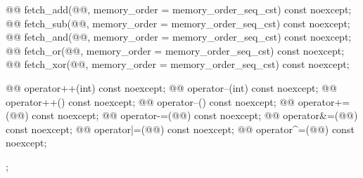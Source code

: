 \begin{codeblock}
{{    @@ fetch_add(@@,
                       memory_order = memory_order_seq_cst) const noexcept;
    @@ fetch_sub(@@,
                       memory_order = memory_order_seq_cst) const noexcept;
    @@ fetch_and(@@,
                       memory_order = memory_order_seq_cst) const noexcept;
    @@ fetch_or(@@,
                      memory_order = memory_order_seq_cst) const noexcept;
    @@ fetch_xor(@@,
                       memory_order = memory_order_seq_cst) const noexcept;

    @@ operator++(int) const noexcept;
    @@ operator--(int) const noexcept;
    @@ operator++() const noexcept;
    @@ operator--() const noexcept;
    @@ operator+=(@@) const noexcept;
    @@ operator-=(@@) const noexcept;
    @@ operator&=(@@) const noexcept;
    @@ operator|=(@@) const noexcept;
    @@ operator^=(@@) const noexcept;
  };
}
\end{codeblock}

 \\

